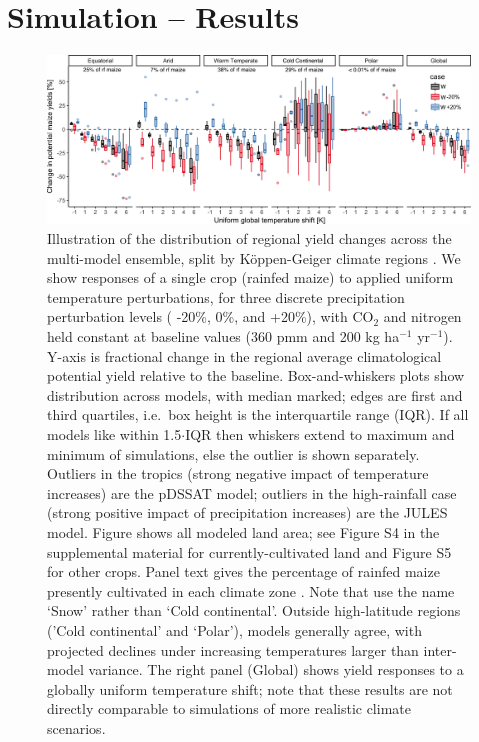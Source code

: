 \documentclass[gmd, manuscript]{copernicus} %
\begin{document}
\section{Simulation -- Results}
\label{S:3}
\begin{figure}[ht]
\centering
   \includegraphics[width=14cm]{figures/global_sim_CG.png}
   \caption{Illustration of the distribution of regional yield changes across the multi-model ensemble, split by K\"{o}ppen-Geiger climate regions \citep{rubel2010}. We show responses of a single crop (rainfed maize) to applied uniform temperature perturbations, for three discrete precipitation perturbation levels ( -20\%, 0\%, and +20\%), with CO$_2$ and nitrogen held constant at baseline values (360 pmm and 200 kg ha$^{-1}$ yr$^{-1}$). Y-axis is fractional change in the regional average climatological potential yield relative to the baseline. Box-and-whiskers plots show distribution across models, with median marked; edges are first and third quartiles, i.e.\ box height is the interquartile range (IQR). If all models like within 1.5$\cdot$IQR then whiskers extend to maximum and minimum of simulations, else the outlier is shown separately. Outliers in the tropics (strong negative impact of temperature increases) are the pDSSAT model; outliers in the high-rainfall case (strong positive impact of precipitation increases) are the JULES model. Figure shows all modeled land area; see Figure S4 in the supplemental material for currently-cultivated land and Figure S5 for other crops. Panel text gives the percentage of rainfed maize presently cultivated in each climate zone \citep[data from][]{Portmann2010}. Note that \citet{rubel2010} use the name `Snow' rather than `Cold continental'. Outside high-latitude regions ('Cold continental' and `Polar'), models generally agree, with projected declines under increasing temperatures larger than inter-model variance. The right panel (Global) shows yield responses to a globally uniform temperature shift; note that these results are not directly comparable to simulations of more realistic climate scenarios.}
   \label{fig:globesim}
\end{figure}
\end{document}
